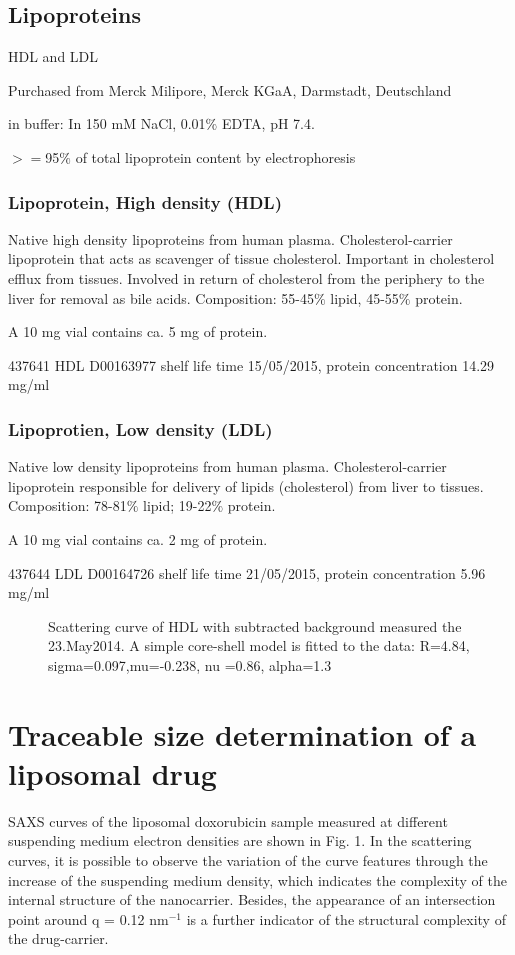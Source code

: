 \subsection{Lipoproteins}
HDL and LDL

Purchased from Merck Milipore, Merck KGaA, Darmstadt, Deutschland

in buffer: In 150 mM NaCl, 0.01$\%$ EDTA, pH 7.4. 

$>=$95$\%$ of total lipoprotein content by electrophoresis 

\subsubsection{Lipoprotein, High density (HDL)}
Native high density lipoproteins from human plasma. Cholesterol-carrier lipoprotein that acts as scavenger of tissue cholesterol. Important in cholesterol efflux from tissues. Involved in return of cholesterol from the periphery to the liver for removal as bile acids. Composition: 55-45$\%$ lipid, 45-55$\%$ protein.

A 10 mg vial contains ca. 5 mg of protein. 


437641 HDL D00163977 shelf life time 15/05/2015, protein concentration 14.29 mg/ml

\subsubsection{Lipoprotien, Low density (LDL)}

Native low density lipoproteins from human plasma. Cholesterol-carrier lipoprotein responsible for delivery of lipids (cholesterol) from liver to tissues. Composition: 78-81$\%$ lipid; 19-22$\%$ protein.

A 10 mg vial contains ca. 2 mg of protein.

437644 LDL D00164726 shelf life time 21/05/2015,
protein concentration 5.96 mg/ml

\begin{figure}
	\centering
		
		\caption{Scattering curve of HDL with subtracted background measured the 23.May2014. A simple core-shell model is fitted to the data: R=4.84, sigma=0.097,mu=-0.238, nu	=0.86, alpha=1.3}
		\label{fig:HDLCoreShellFit}
\end{figure}

\section{Traceable size determination of a liposomal drug}
SAXS curves of the liposomal doxorubicin sample measured at different suspending medium electron densities are shown in Fig. 1. In the scattering curves, it is possible to observe the variation of the curve features through the increase of the suspending medium density, which indicates the complexity of the internal structure of the nanocarrier. Besides, the appearance of an intersection point around q = 0.12 nm$^{-1}$ is a further indicator of the structural complexity of the drug-carrier.

